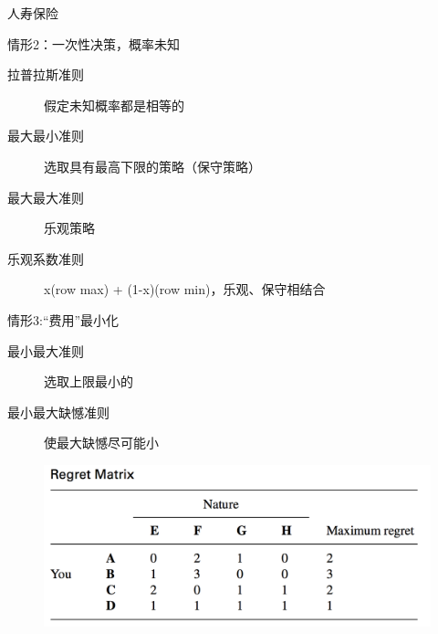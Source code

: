 \documentclass[UTF8]{ctexbeamer}
\begin{document}
\begin{frame}{人寿保险}
  
\end{frame}

\begin{frame}{情形2：一次性决策，概率未知}

  \begin{description}
  \item[拉普拉斯准则] 假定未知概率都是相等的
  \item[最大最小准则] 选取具有最高下限的策略（保守策略）
  \item[最大最大准则] 乐观策略
  \item[乐观系数准则] x(row max) + (1-x)(row min)，乐观、保守相结合
  \end{description}
  
\end{frame}

\begin{frame}{情形3:“费用”最小化}

  \begin{description}
  \item[最小最大准则] 选取上限最小的
  \item[最小最大缺憾准则] 使最大缺憾尽可能小
  \end{description}
  
  \begin{figure}
    \includegraphics[width=0.8\textwidth{}]{regret.png}
  \end{figure}


\end{frame}
\end{document}
\end{itemize}
\end{frame}
\end{document}
